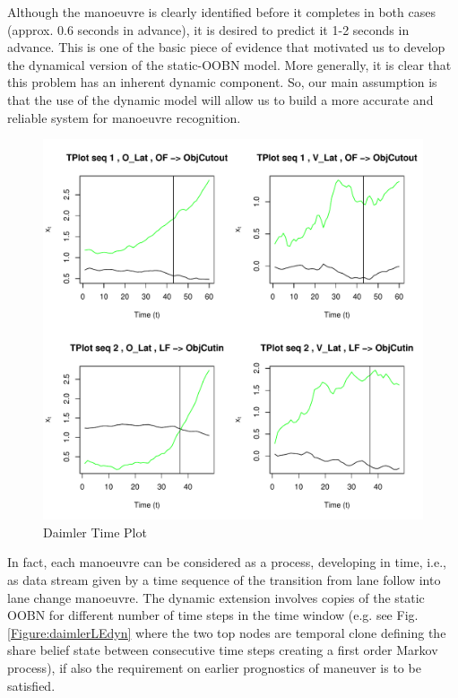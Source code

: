 Although the manoeuvre is clearly identified before it completes in both cases (approx. 0.6 seconds in advance), it is desired to predict it 1-2 seconds in advance.
This is one of the basic piece of evidence that motivated us to develop the dynamical version of the static-OOBN model. More generally, it is clear that this problem has an inherent dynamic component. So, our main assumption is that the use of the dynamic model will allow us to build a more accurate and reliable system for manoeuvre recognition. 


\begin{figure}[tb]
\begin{center}
\includegraphics[scale=0.65]{./figures/DaimlerLE_EGO_L_LE_OBJ_L_OBJCut.pdf}
\caption{\label{Figure:daimlerTPlot}Daimler Time Plot}
\end{center}
\end{figure}

In fact, each manoeuvre can be considered as a process, developing in time, i.e., as data stream given by a time sequence of the transition from lane follow into lane change manoeuvre. The dynamic extension involves copies of the static OOBN for different number of time steps in the time window (e.g. see Fig. \ref{Figure:daimlerLEdyn} where the two top nodes are temporal clone defining the share belief state between consecutive time steps creating a first order Markov process), if also the requirement on earlier prognostics of maneuver is to be satisfied. 

